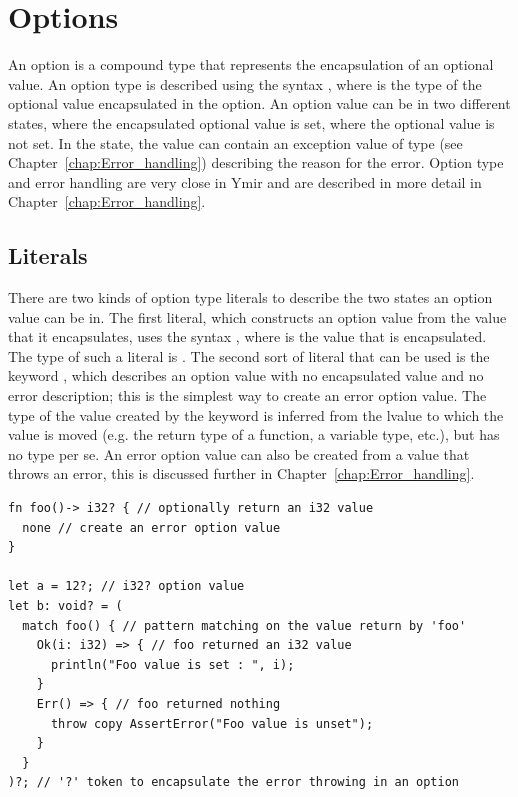 \section{Options}%
\label{sec:options}

An option is a compound type that represents the encapsulation of an optional
value. An option type is described using the syntax , where
 is the type of the optional value encapsulated in the option. An
option value can be in two different states,  where the encapsulated
optional value is set,  where the optional value is not set. In the
 state, the value can contain an exception value of type
 (see Chapter~\ref{chap:Error_handling}) describing the
reason for the error. Option type and error handling are very close in Ymir and
are described in more detail in Chapter~\ref{chap:Error_handling}.

\subsection{Literals}

There are two kinds of option type literals to describe the two states an option
value can be in. The first literal, which constructs an option value from the
value that it encapsulates, uses the syntax , where  is the
value that is encapsulated. The type of such a literal is .
The second sort of literal that can be used is the keyword , which
describes an option value with no encapsulated value and no error description;
this is the simplest way to create an error option value. The type of the value
created by the keyword  is inferred from the lvalue to which the
value is moved (e.g. the return type of a function, a variable type, etc.), but
has no type per se. An error option value can also be created from a value that
throws an error, this is discussed further in Chapter~\ref{chap:Error_handling}.

\begin{lstlisting}[style=coloredverbatimError]
fn foo()-> i32? { // optionally return an i32 value
  none // create an error option value
}

let a = 12?; // i32? option value
let b: void? = (
  match foo() { // pattern matching on the value return by 'foo'
    Ok(i: i32) => { // foo returned an i32 value
      println("Foo value is set : ", i);
    }
    Err() => { // foo returned nothing
      throw copy AssertError("Foo value is unset");
    }
  }
)?; // '?' token to encapsulate the error throwing in an option

\end{lstlisting}

